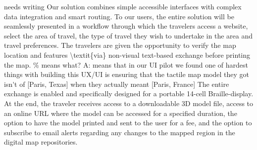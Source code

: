 \ac{ needs writing


Our solution combines simple accessible interfaces with complex data integration and smart routing. To our users, the entire solution will be seamlessly presented in a workflow through which the travelers access a website, select the area of travel, the type of travel they wish to undertake in the area and travel preferences. The travelers are given the opportunity to verify the map location and features \textit{via} non-visual text-based exchange before printing the map.

The entire exchange is enabled and specifically designed for a portable 14-cell Braille-display. At the end, the traveler receives access to a downloadable 3D model file, access to an online URL where the model can be accessed for a specified duration, the option to have the model printed and sent to the user for a fee, and the option to subscribe to email alerts regarding any changes to the mapped region in the digital map repositories. 

}
